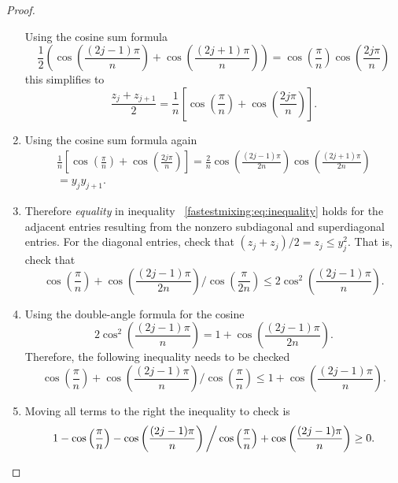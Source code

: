 \documentclass[12pt]{article}
\begin{document}
\begin{proof}
\begin{enumerate}
            Using the cosine sum formula
            \[
                \frac{1}{2} \left( \cos\left( \frac{(2j-1)\pi }{n }
                \right) + \cos\left( \frac{(2j+1)\pi }{n } \right)
                \right) = \cos\left( \frac{\pi}{n} \right) \cos\left(
                \frac{2 j \pi}{n} \right)
            \] this simplifies to
            \[
                \frac{z_j + z_{j+1}}{2} = \frac{1}{n} \left[ \cos\left(
                \frac{\pi} {n} \right) + \cos\left( \frac{2j\pi}{n}
                \right) \right].
            \]
        \item
            Using the cosine sum formula again
            \begin{multline*}
                \frac{1}{n} \left[ \cos\left( \frac{\pi}{n} \right) +
                \cos\left( \frac{2j\pi}{n} \right) \right] = \frac{2}{n}
                \cos\left( \frac{(2j-1) \pi }{2n} \right) \cos\left(
                \frac{(2j+1) \pi }{2n} \right) \\
                = y_{j} y_{j+1}.
            \end{multline*}
        \item
            Therefore \emph{equality} in inequality~%
            \eqref{fastestmixing:eq:inequality} holds for the adjacent
            entries resulting from the nonzero subdiagonal and
            superdiagonal entries.  For the diagonal entries, check that
            \( (z_j + z_j)/2 = z_j \le y_j^2 \).  That is, check that
            \[
                \cos\left( \frac{\pi}{n} \right) + \cos\left( \frac{(2j-1)\pi}
                {2n} \right) \bigg/ \cos\left( \frac{\pi}{2n} \right)
                \le 2 \cos^2\left( \frac{(2j-1)\pi}{n} \right).
            \]
        \item
            Using the double-angle formula for the cosine
            \[
                2 \cos^2\left( \frac{(2j-1)\pi}{n} \right) = 1 + \cos\left
                ( \frac{(2j-1)\pi}{2n} \right).
            \] Therefore, the following inequality needs to be checked
            \[
                \cos\left( \frac{\pi}{n} \right) + \cos\left( \frac{(2j-1)\pi}
                {n} \right) \bigg/ \cos\left( \frac{\pi}{n} \right) \le
                1 + \cos\left( \frac{(2j-1)\pi}{n} \right).
            \]
        \item
            Moving all terms to the right the inequality to check is
            \[
                1 - \cos\left( \frac{\pi}{n} \right) - \cos\left( \frac{%
                (2j-1)\pi} {n} \right) \bigg/ \cos\left( \frac{\pi}{n}
                \right)+ \cos\left( \frac{(2j-1)\pi}{n} \right) \ge 0.
\]
\end{enumerate}
\end{proof}
\end{document}

